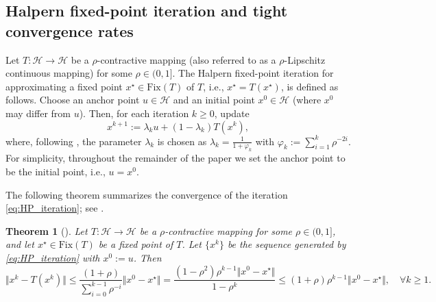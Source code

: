 \documentclass{article}
\theoremstyle{plain}
\newtheorem{theorem}{Theorem}[section]
\theoremstyle{definition}
\newcommand{\Hil}{\mathcal{H}}
\newcommand{\sets}[1]{\{#1\}}
\newcommand{\norms}[1]{\Vert#1\Vert}
\newcommand{\0}{\boldsymbol{0}}
\begin{document}
\subsection{Halpern fixed-point iteration and tight convergence rates}\label{sec:HP_convergence}
Let $T : \Hil \to \Hil$ be a $\rho$-contractive mapping (also referred to as a $\rho$-Lipschitz continuous mapping) for some $\rho \in (0,1]$.
The Halpern fixed-point iteration for approximating a fixed point $x^{\star} \in \mathrm{Fix}(T)$ of $T$, i.e., $x^{\star} = T(x^{\star})$, is defined as follows.
Choose an anchor point $u \in \Hil$ and an initial point $x^0 \in \Hil$ (where $x^0$ may differ from $u$).
Then, for each iteration $k \geq 0$, update
\begin{equation}\label{eq:HP_iteration}
x^{k+1} := \lambda_k u + (1 - \lambda_k)T(x^k),
\tag{HP}
\end{equation}
where, following \cite{park2022exact}, the parameter $\lambda_k$ is chosen as
$\lambda_k = \frac{1}{1 + \varphi_k}$ with $\varphi_k := \sum_{i=1}^k\rho^{-2i}$.
For simplicity, throughout the remainder of the paper we set the anchor point to be the initial point, i.e., $u = x^0$.

The following theorem summarizes the convergence of the iteration \eqref{eq:HP_iteration}; see \cite[Corollary~3.3]{park2022exact}.

\begin{theorem}[\cite{park2022exact}]\label{th:linear_convergence_of_HP}
Let $T : \Hil \to \Hil$ be a $\rho$-contractive mapping for some $\rho \in (0, 1]$, and let $x^{\star} \in \mathrm{Fix}(T)$ be a fixed point of $T$.
Let $\sets{x^k}$ be the sequence generated by \eqref{eq:HP_iteration} with $x^0 := u$.
Then
\begin{equation}\label{eq:th11_convergence_bound}
\norms{x^k - T(x^k)} \leq \frac{(1+\rho)}{\sum_{i=0}^{k-1}\rho^{-i} }\norms{x^0 - x^{\star}} =  \frac{(1-\rho^2)\rho^{k-1}\norms{x^0 - x^{\star}}}{1 - \rho^k} \leq (1+\rho)\rho^{k-1}\norms{x^0 - x^{\star}}, \quad \forall k \geq 1.
\end{equation}
\end{theorem}
\end{document}
